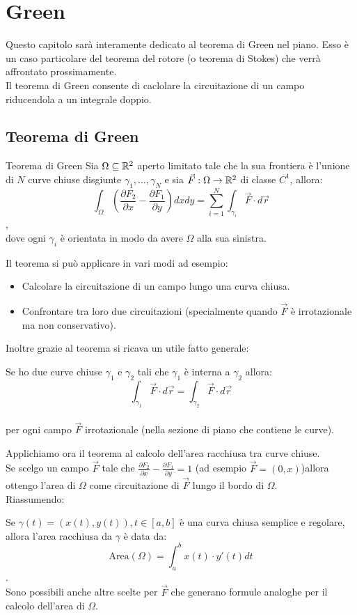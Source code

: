 \chapter{Green}
Questo capitolo sarà interamente dedicato al teorema di Green nel piano. Esso è un caso particolare del teorema del rotore (o teorema di Stokes) che verrà affrontato prossimamente.\\

Il teorema di Green consente di caclolare la circuitazione di un campo riducendola a un integrale doppio.

\section{Teorema di Green}
\begin{teorema}{Teorema di Green}
Sia $\Omega \subseteq \mathbb{R}^2$ aperto limitato tale che la sua frontiera è l'unione di $N$ curve chiuse disgiunte $\gamma_1, \dots, \gamma_N$  e sia $\vec F:\Omega\rightarrow \mathbb{R}^2$ di classe $C^1$, allora:
$$ \int_\Omega \left(\frac{\partial F_2}{\partial x}-\frac{\partial F_1}{\partial y}\right) dxdy = \sum_{i=1}^{N} \int_{\gamma_i} \vec{F} \cdot d\vec{r} $$,\\dove ogni $\gamma_i$ è orientata in modo da avere $\Omega$ alla sua sinistra.
\end{teorema}

Il teorema si può applicare in vari modi ad esempio:
\begin{itemize}
\item Calcolare la circuitazione di un campo lungo una curva chiusa.
\item Confrontare tra loro due circuitazioni (specialmente quando $\vec F$ è irrotazionale ma non conservativo).
\end{itemize}

Inoltre grazie al teorema si ricava un utile fatto generale:
\begin{corollario}{}
  Se ho due curve chiuse $\gamma_1$ e $\gamma_2$ tali che $\gamma_1$ è interna a $\gamma_2$ allora: $$\int_{\gamma_1} \vec F \cdot d\vec r = \int_{\gamma_2} \vec F \cdot d\vec r$$\\
  per ogni campo $\vec F$ irrotazionale (nella sezione di piano che contiene le curve).
\end{corollario}

Applichiamo ora il teorema al calcolo dell'area racchiusa tra curve chiuse.\\
Se scelgo un campo $\vec F$ tale che $\frac{\partial F_2}{\partial x}-\frac{\partial F_1}{\partial y}=1$ (ad esempio $\vec F = (0,x)$)allora ottengo l'area di $\Omega$ come circuitazione di $\vec F$ lungo il bordo di $\Omega$.\\
Riassumendo:
\begin{teorema}{}
  Se $\gamma(t)= (x(t), y(t)), t \in [a,b]$ è una curva chiusa semplice e regolare, allora l'area racchiusa da $\gamma$ è data da:
  $$\text{Area}(\Omega) = \int_{a}^{b} x(t)\cdot y'(t) dt$$.\\
  Sono possibili anche altre scelte per $\vec F$ che generano formule analoghe per il calcolo dell'area di $\Omega$.
\end{teorema}
